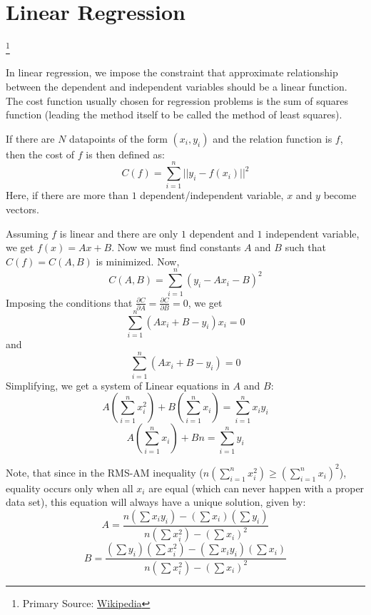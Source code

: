 \documentclass[12 pt]{report}
\begin{document}
    \section{Linear Regression} \footnote {Primary Source: \href{https://en.wikipedia.org/wiki/Linear_regression}{Wikipedia}}

    In linear regression, we impose the constraint that approximate relationship between the dependent and independent variables should be a linear 
    function. The cost function usually chosen for regression problems is the sum of squares function (leading the method itself to be called the 
    method of least squares). 

    If there are $N$ datapoints of the form $(x_{i}, y_{i})$ and the relation function is $f$, then the cost of $f$ is then  defined as:
    \begin{equation}
        C(f) = \sum_{i = 1}^{n} ||y_{i} - f(x_{i})||^{2}
    \end{equation}
    Here, if there are more than $1$ dependent/independent variable, $x$ and $y$ become vectors.

    Assuming $f$ is linear and there are only $1$ dependent and $1$ independent variable, we get $f(x) = Ax + B$. Now we must find constants $A$ and $B$ such that $C(f) = C(A, B)$ is minimized. Now,
    \begin{equation}
        C(A, B) = \sum_{i = 1}^{n} (y_{i} - Ax_{i} - B)^{2}
    \end{equation}
    Imposing the conditions that $\frac{\partial C}{\partial A} = \frac{\partial C}{\partial B} = 0$, we get
    \begin{equation}
        \sum_{i = 1}^{n} (Ax_{i} + B - y_{i})x_{i} = 0
    \end{equation}
    and
    \begin{equation}
        \sum_{i = 1}^{n} (Ax_{i} + B - y_{i}) = 0
    \end{equation}
    Simplifying, we get a system of Linear equations in $A$ and $B$:
    \begin{equation}
        A(\sum_{i = 1}^{n} x_{i}^{2}) + B(\sum_{i = 1}^{n} x_{i}) = \sum_{i = 1}^{n} x_{i}y_{i}
    \end{equation}
    \begin{equation}
        A(\sum_{i = 1}^{n} x_{i}) + Bn = \sum_{i = 1}^{n} y_{i}
    \end{equation}

    Note, that since in the RMS-AM inequality ($n(\sum_{i = 1}^{n} x_{i}^{2}) \geq (\sum_{i = 1}^{n} x_{i})^{2}$), equality occurs only when all 
    $x_{i}$ are equal (which can never happen with a proper data set), this equation will always have a unique solution, given by:
    \begin{equation}
        A = \frac{n(\sum x_{i}y_{i}) - (\sum x_{i})(\sum y_{i})}{n(\sum x_{i}^{2}) - (\sum x_{i})^{2}}
    \end{equation}
    \begin{equation}
        B = \frac{(\sum y_{i})(\sum x_{i}^{2}) - (\sum x_{i}y_{i})(\sum x_{i})}{n(\sum x_{i}^{2}) - (\sum x_{i})^{2}}
    \end{equation}
\end{document}
